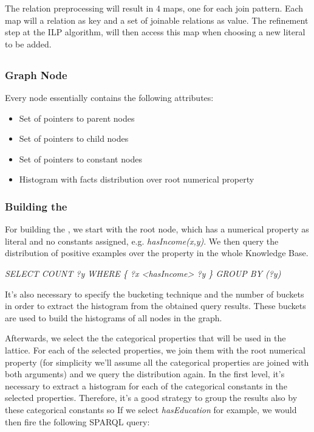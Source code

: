The relation preprocessing will result in 4 maps, one for each join pattern. Each map will a relation as key and a set of joinable relations as value. The refinement step at the ILP algorithm, will then access this map when choosing a new literal to be added.


\subsection{\graphname}

\subsubsection{Graph Node}

Every node essentially contains the following attributes:

\begin{itemize}
 \item Set of pointers to parent nodes
 \item Set of pointers to child nodes
 \item Set of pointers to constant nodes
 \item Histogram with facts distribution over root numerical property
\end{itemize}


\subsubsection{Building the \graphname}

For building the \graphname, we start with the root node, which has a numerical property as literal and no constants assigned, e.g. \emph{hasIncome(x,y)}. We then query the  distribution of positive examples over the property in the whole Knowledge Base.

\begin{center}
 \emph{SELECT COUNT ?y WHERE \{ ?x <hasIncome> ?y \} GROUP BY (?y)}
\end{center}

It's also necessary to specify the bucketing technique and the number of buckets in order to extract the histogram from the obtained query results. These buckets are used to build the histograms of all nodes in the graph.

Afterwards, we select the the categorical properties that will be used in the lattice. For each of the selected properties, we join them with the root numerical property (for simplicity we'll assume all the categorical properties are joined with both  arguments) and we query the distribution again. In the first level, it's necessary to extract a histogram for each of the categorical constants in the selected properties. Therefore, it's a good strategy to group the results also by these categorical constants so If we select \emph{hasEducation} for example, we would then fire the following SPARQL query:

